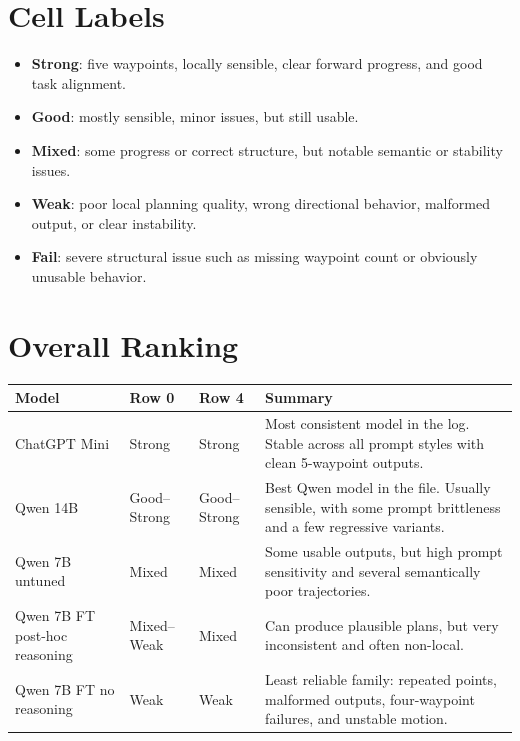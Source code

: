 \documentclass[10pt]{article}
\begin{document}
\section*{Cell Labels}
\begin{itemize}
  \item \textbf{Strong}: five waypoints, locally sensible, clear forward progress, and good task alignment.
  \item \textbf{Good}: mostly sensible, minor issues, but still usable.
  \item \textbf{Mixed}: some progress or correct structure, but notable semantic or stability issues.
  \item \textbf{Weak}: poor local planning quality, wrong directional behavior, malformed output, or clear instability.
  \item \textbf{Fail}: severe structural issue such as missing waypoint count or obviously unusable behavior.
\end{itemize}

\section*{Overall Ranking}
\begin{table}[H]
\centering
\begin{tabularx}{\textwidth}{p{3.2cm}p{2.1cm}p{2.1cm}Y}
\toprule
Model & Row 0 & Row 4 & Summary \\
\midrule
ChatGPT Mini & Strong & Strong & Most consistent model in the log. Stable across all prompt styles with clean 5-waypoint outputs. \\
Qwen 14B & Good--Strong & Good--Strong & Best Qwen model in the file. Usually sensible, with some prompt brittleness and a few regressive variants. \\
Qwen 7B untuned & Mixed & Mixed & Some usable outputs, but high prompt sensitivity and several semantically poor trajectories. \\
Qwen 7B FT post-hoc reasoning & Mixed--Weak & Mixed & Can produce plausible plans, but very inconsistent and often non-local. \\
Qwen 7B FT no reasoning & Weak & Weak & Least reliable family: repeated points, malformed outputs, four-waypoint failures, and unstable motion. \\
\bottomrule
\end{tabularx}
\end{table}
\end{document}
